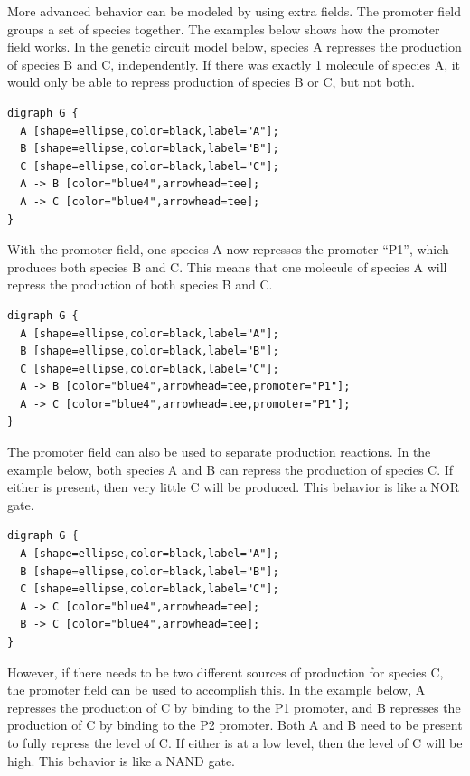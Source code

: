\documentclass[titlepage,11pt]{article}
\begin{document}
More advanced behavior can be modeled by using extra fields.
The promoter field groups a set of species together. The examples
below shows how the promoter field works. In the genetic circuit
model below, species A represses the production of species B and
C, independently. If there was exactly 1 molecule of species A,
it would only be able to repress production of species B or C,
but not both. 

\begin{verbatim}
digraph G {
  A [shape=ellipse,color=black,label="A"];
  B [shape=ellipse,color=black,label="B"];
  C [shape=ellipse,color=black,label="C"];
  A -> B [color="blue4",arrowhead=tee];
  A -> C [color="blue4",arrowhead=tee];
} 
\end{verbatim}

With the promoter field, one species A now represses the
promoter ``P1'', which produces both species B and C.
This means that one molecule of species A will repress the
production of both species B and C. 

\begin{verbatim}
digraph G {
  A [shape=ellipse,color=black,label="A"];
  B [shape=ellipse,color=black,label="B"];
  C [shape=ellipse,color=black,label="C"];
  A -> B [color="blue4",arrowhead=tee,promoter="P1"];
  A -> C [color="blue4",arrowhead=tee,promoter="P1"];
}
\end{verbatim}

The promoter field can also be used to separate production
reactions. In the example below, both species A and B can repress
the production of species C. If either is present, then very
little C will be produced. This behavior is like a NOR gate. 

\begin{verbatim}
digraph G {
  A [shape=ellipse,color=black,label="A"];
  B [shape=ellipse,color=black,label="B"];
  C [shape=ellipse,color=black,label="C"];
  A -> C [color="blue4",arrowhead=tee];
  B -> C [color="blue4",arrowhead=tee];
} 
\end{verbatim}

However, if there needs to be two different sources of
production for species C, the promoter field can be used to
accomplish this. In the example below, A represses the production
of C by binding to the P1 promoter, and B represses the
production of C by binding to the P2 promoter. Both A and B need
to be present to fully repress the level of C. If either is at a
low level, then the level of C will be high. This behavior is
like a NAND gate. 
\end{document}
